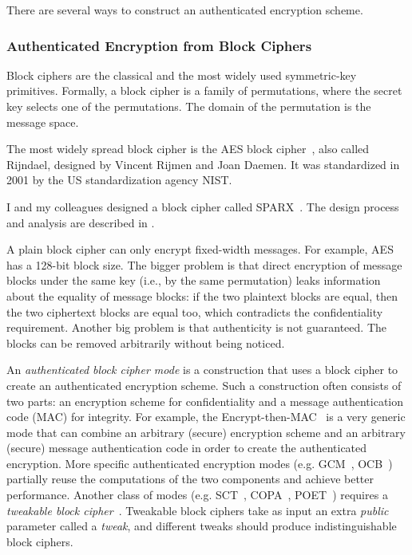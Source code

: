 There are several ways to construct an authenticated encryption scheme.

\subsubsection{Authenticated Encryption from Block Ciphers}

Block ciphers are the classical and the most widely used symmetric-key primitives. Formally, a block cipher is a family of permutations, where the secret key selects one of the permutations. The domain of the permutation is the message space. 

The most widely spread block cipher is the AES block cipher~\cite{AES}, also called Rijndael, designed by Vincent Rijmen and Joan Daemen. It was standardized in 2001 by the US standardization agency NIST.

I and my colleagues designed a block cipher called SPARX~\cite{OurSPARX}. The design process and analysis are described in .

A plain block cipher can only encrypt fixed-width messages. For example, AES has a 128-bit block size. The bigger problem is that direct encryption of message blocks under the same key (i.e., by the same permutation) leaks information about the equality of message blocks: if the two plaintext blocks are equal, then the two ciphertext blocks are equal too, which contradicts the confidentiality requirement.
Another big problem is that authenticity is not guaranteed. The blocks can be removed arbitrarily without being noticed.

An \emph{authenticated block cipher mode} is a construction that uses a block cipher to create an authenticated encryption scheme. Such a construction often consists of two parts: an encryption scheme for confidentiality and a message authentication code (MAC) for integrity. For example, the Encrypt-then-MAC~\cite{EncryptMAC} is a very generic mode that can combine an arbitrary (secure) encryption scheme and an arbitrary (secure) message authentication code in order to create the authenticated encryption. More specific authenticated encryption modes (e.g. GCM~\cite{GCM}, OCB~\cite{OCB}) partially reuse the computations of the two components and achieve better performance. Another class of modes (e.g. SCT~\cite{SCT}, COPA~\cite{COPA}, POET~\cite{POET}) requires a \emph{tweakable block cipher}~\cite{TBC}. Tweakable block ciphers take as input an extra \emph{public} parameter called a \emph{tweak}, and different tweaks should produce indistinguishable block ciphers.


